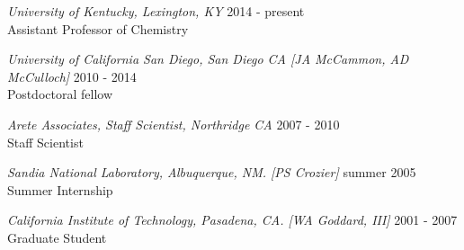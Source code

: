 \begin{resume}
\vspace{8pt} %

{\sl University of Kentucky, Lexington, KY } \hfill 2014 - present\\ 
Assistant Professor of Chemistry


{\sl University of California San Diego,  San
Diego CA [JA
McCammon, AD McCulloch] } \hfill 2010 - 2014\\ 
Postdoctoral fellow 

{\sl Arete Associates, Staff Scientist, Northridge CA} \hfill 	2007 - 2010\\
Staff Scientist

{\sl Sandia National Laboratory, Albuquerque, NM.  [PS Crozier]} \hfill 	summer 2005\\
Summer Internship

{\sl California Institute of Technology, Pasadena, CA.  [WA Goddard, III]	 } \hfill 2001 - 2007\\
Graduate Student
\begin{comment}
{\sl Freie Universitaet zu Berlin, Berlin, Germany.  [EW Knapp]} \hfill 2001 - 2002\\
Fulbright fellow

{\sl U. North Carolina, Asheville, NC.  [G Heard, BE Holmes]	} \hfill 1999 - 2001\\
Undergraduate researcher

{\sl University of Cincinnati, OH.  [T Beck, W Connick]} \hfill 	summer 2000 \\
Summer researcher 
\end{comment}


\end{resume}
